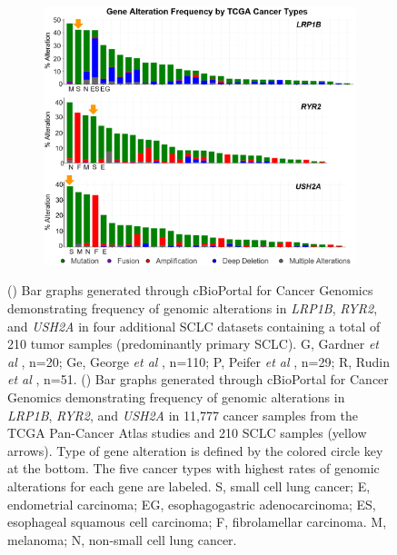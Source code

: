 \begin{figure}[p]
\begin{subfigure}{0.17\textwidth}
        \caption{}\label{fig:sclc:drivers_210}
    \end{subfigure}%
    \hfill%
    \begin{subfigure}{0.73\textwidth}
        \includegraphics[width=\linewidth,keepaspectratio]{images/sclc/drivers_cbioportal}
        \caption{}\label{fig:sclc:drivers_cbioportal}
    \end{subfigure}%
    \hspace{1cm}
    
    \caption[Prevalence of \textit{LRP1B}, \textit{RYR2} and \textit{USH2A} mutations.]{() Bar graphs generated through cBioPortal for Cancer Genomics demonstrating frequency of genomic alterations in \textit{LRP1B}, \textit{RYR2}, and \textit{USH2A} in four additional SCLC datasets containing a total of 210 tumor samples (predominantly primary SCLC)\@. G, Gardner \textit{et al} \cite{gardner2017}, n=20; Ge, George \textit{et al} \cite{george2015}, n=110; P, Peifer \textit{et al} \cite{peifer2012}, n=29; R, Rudin \textit{et al} \cite{rudin2012}, n=51. () Bar graphs generated through cBioPortal for Cancer Genomics demonstrating frequency of genomic alterations in \textit{LRP1B}, \textit{RYR2}, and \textit{USH2A} in 11,777 cancer samples from the TCGA Pan-Cancer Atlas studies and 210 SCLC samples (yellow arrows). Type of gene alteration is defined by the colored circle key at the bottom. The five cancer types with highest rates of genomic alterations for each gene are labeled. S, small cell lung cancer; E, endometrial carcinoma; EG, esophagogastric adenocarcinoma; ES, esophageal squamous cell carcinoma; F, fibrolamellar carcinoma. M, melanoma; N, non-small cell lung cancer.}
    \label{fig:sclc:driver_bar_graphs}
\end{figure}

